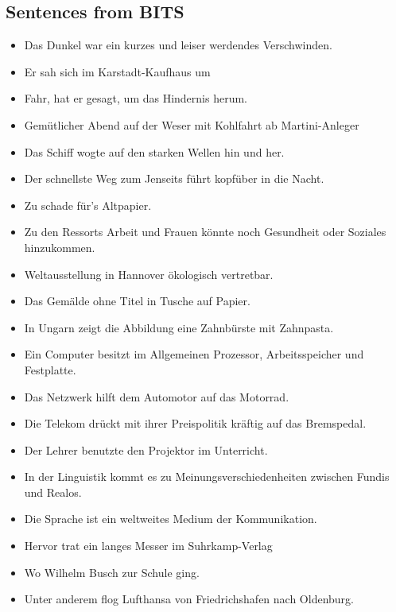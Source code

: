 \documentclass[a4paper, 12pt]{article}
\begin{document}
\begin{appendix}
\subsection{Sentences from BITS}
\begin{itemize}
\item Das Dunkel war ein kurzes und leiser werdendes Verschwinden.
\item Er sah sich im Karstadt-Kaufhaus um
\item Fahr, hat er gesagt, um das Hindernis herum.
\item Gemütlicher Abend auf der Weser mit Kohlfahrt ab Martini-Anleger
\item Das Schiff wogte auf den starken Wellen hin und her.
\item Der schnellste Weg zum Jenseits führt kopfüber in die Nacht.
\item Zu schade für's Altpapier.
\item Zu den Ressorts Arbeit und Frauen könnte noch Gesundheit oder Soziales hinzukommen.
\item Weltausstellung in Hannover ökologisch vertretbar.
\item Das Gemälde ohne Titel in Tusche auf Papier.
\item In Ungarn zeigt die Abbildung eine Zahnbürste mit Zahnpasta.
\item Ein Computer besitzt im Allgemeinen Prozessor, Arbeitsspeicher und Festplatte.
\item Das Netzwerk hilft dem Automotor auf das Motorrad.
\item Die Telekom drückt mit ihrer Preispolitik kräftig auf das Bremspedal.
\item Der Lehrer benutzte den Projektor im Unterricht.
\item In der Linguistik kommt es zu Meinungsverschiedenheiten zwischen Fundis und Realos.
\item Die Sprache ist ein weltweites Medium der Kommunikation.
\item Hervor trat ein langes Messer im Suhrkamp-Verlag
\item Wo Wilhelm Busch zur Schule ging.
\item Unter anderem flog Lufthansa von Friedrichshafen nach Oldenburg.
\end{itemize}
\end{appendix}

\cleardoublepage


\end{document}
